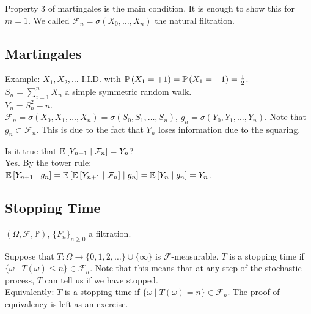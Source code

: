 \documentclass[english, course]{Notes}
\begin{document}
Property $3$ of martingales is the main condition. It is enough to show this for $m = 1$. We called $\mathcal{F}_n = \sigma(X_0, \dots, X_n)$ the natural filtration.

\subsection{Martingales}
Example:
$X_1, X_2, \dots$ I.I.D. with $\mathbb{P}\left(X_1 = +1\right) = \mathbb{P}\left(X_1 = -1\right) = \frac{1}{2}$.\\

$S_n = \sum_{i = 1}^n X_n$ a simple symmetric random walk.\\

$Y_n = S_n^2 - n$.\\

$\mathcal{F}_n = \sigma(X_0, X_1, \dots, X_n) = \sigma(S_0, S_1, \dots, S_n)$, $g_n = \sigma(Y_0, Y_1, \dots, Y_n)$. Note that $g_n \subset \mathcal{F}_n$. This is due to the fact that $Y_n$ loses information due to the squaring.\\

\begin{exercise}
	Is it true that $\mathbb{E}\left[Y_{n+1} \mid \mathcal{F}_n\right] = Y_n$?\\
	
	Yes. By the tower rule:\\
    $\mathbb{E}\left[Y_{n+1} \mid g_n\right] = \mathbb{E}\left[\mathbb{E}\left[Y_{n + 1} \mid \mathcal{F}_n\right] \mid g_n\right] = \mathbb{E}\left[Y_n \mid g_n\right] = Y_n$. 
\end{exercise}

\subsection{Stopping Time}
$(\Omega, \mathcal{F}, \mathbb{P})$, $\{F_n\}_{n \geq 0}$ a filtration.\\

\begin{definition}
Suppose that $T: \Omega \to \{0, 1, 2, \dots\} \cup \{\infty\}$ is $\mathcal{F}$-measurable. $T$ is a stopping time if $\{\omega \mid T(\omega) \leq n\} \in \mathcal{F}_n$. Note that this means that at any step of the stochastic process, $T$ can tell us if we have stopped.\\

Equivalently: $T$ is a stopping time if $\{\omega \mid T(\omega) = n\} \in \mathcal{F}_n$. The proof of equivalency is left as an exercise.
\end{definition}
\end{document}
